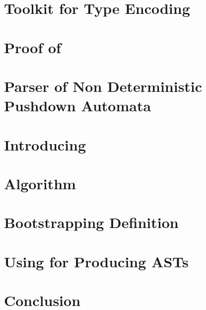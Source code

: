 \documentclass[a4paper,USenglish]{lipics}
\begin{document}
\section{Toolkit for Type Encoding}
\label{Section:toolkit}
%

\section{Proof of }
\label{Section:proof}
%

\section{Parser of Non Deterministic Pushdown Automata}
\label{Section:bridge}
%

\section{Introducing \Self}
\label{Section:fajita}
%

\section{Algorithm}
\label{Section:algorithm}


\section{Bootstrapping Definition}
\label{Section:bootstrapping}
%

\section{Using \Self for Producing ASTs}


\section{Conclusion}
\label{Section:zz}
%

\small
%

\end{document}

